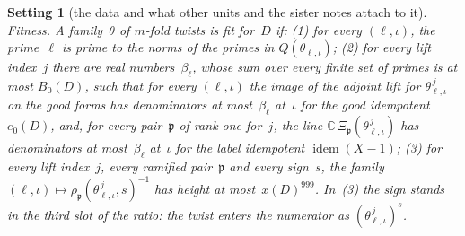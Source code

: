 \documentclass[11pt,a4paper]{article}
\newcommand{\kw}[1]{\emph{#1}}
\newcommand{\m}[1]{\mbox{$#1$}}        %
\theoremstyle{plainx}
\theoremstyle{uprightx}
\newtheorem{setting}[theorem]{Setting}          %
\newcommand{\CC}{\mathbb{C}}
\newcommand{\rat}[3]{\rho_{#1}(#2,#3)}      %
\newcommand{\idem}{\operatorname{idem}}
\newcommand{\triv}[2]{\Xi_{#1}(#2)}
\begin{document}
\begin{setting}[the data and what other units and the sister notes attach to it]
\emph{Fitness.} A family~$\theta$ of $m$-fold twists is \kw{fit for~$D$} if: (1) for every \m{(\ell,\iota)}, the
prime~$\ell$ is prime to the norms of the primes in \m{Q(\theta_{\ell,\iota})}; (2) for every lift index~$j$ there are
real numbers~$\beta_\ell$, whose sum over every finite set of primes is at most \m{B_0(D)}, such that for every
\m{(\ell,\iota)} the image of the adjoint lift for \m{\theta_{\ell,\iota}^{\,j}} on the good forms has denominators at
most~$\beta_\ell$ at~$\iota$ for the good idempotent \m{e_0(D)}, and, for every pair~$\mathfrak{p}$ of rank one for~$j$, the line
\m{\CC\,\triv{\mathfrak{p}}{\theta_{\ell,\iota}^{\,j}}} has denominators at most~$\beta_\ell$ at~$\iota$ for the label idempotent
\m{\idem(X-1)}; (3) for every lift index~$j$, every ramified pair~$\mathfrak{p}$ and every sign~$s$, the family
\m{(\ell,\iota)\mapsto\rat{\mathfrak{p}}{\theta_{\ell,\iota}^{\,j}}{s}^{-1}} has height at most~$x(D)^{999}$. In~(3) the sign stands in
the third slot of the ratio: the twist enters the numerator as \m{(\theta_{\ell,\iota}^{\,j})^{s}}.
\end{setting}
\end{document}
